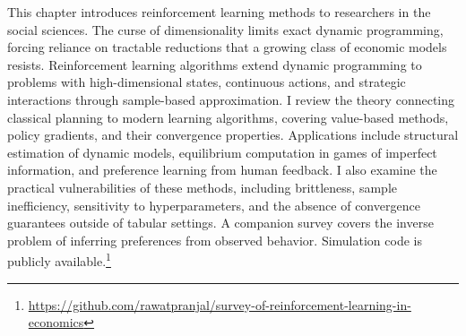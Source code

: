 This chapter introduces reinforcement learning methods to researchers in the social sciences. The curse of dimensionality limits exact dynamic programming, forcing reliance on tractable reductions that a growing class of economic models resists. Reinforcement learning algorithms extend dynamic programming to problems with high-dimensional states, continuous actions, and strategic interactions through sample-based approximation. I review the theory connecting classical planning to modern learning algorithms, covering value-based methods, policy gradients, and their convergence properties. Applications include structural estimation of dynamic models, equilibrium computation in games of imperfect information, and preference learning from human feedback. I also examine the practical vulnerabilities of these methods, including brittleness, sample inefficiency, sensitivity to hyperparameters, and the absence of convergence guarantees outside of tabular settings. A companion survey \citep{RustRawat2026} covers the inverse problem of inferring preferences from observed behavior. Simulation code is publicly available.\footnote{\url{https://github.com/rawatpranjal/survey-of-reinforcement-learning-in-economics}}
